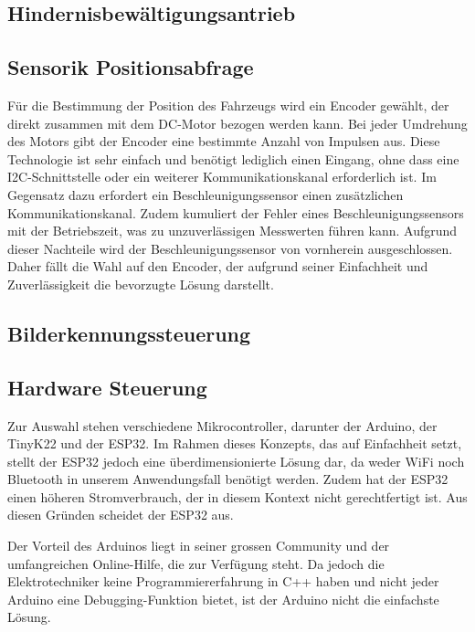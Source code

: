 \documentclass[../main.tex]{subfiles}
\begin{document}
\subsection{Hindernisbewältigungsantrieb}



\subsection{Sensorik Positionsabfrage}
Für die Bestimmung der Position des Fahrzeugs wird ein Encoder gewählt, der direkt zusammen mit dem DC-Motor bezogen werden kann. Bei jeder Umdrehung des Motors gibt der Encoder eine bestimmte Anzahl von Impulsen aus. Diese Technologie ist sehr einfach und benötigt lediglich einen Eingang, ohne dass eine I2C-Schnittstelle oder ein weiterer Kommunikationskanal erforderlich ist. Im Gegensatz dazu erfordert ein Beschleunigungssensor einen zusätzlichen Kommunikationskanal. Zudem kumuliert der Fehler eines Beschleunigungssensors mit der Betriebszeit, was zu unzuverlässigen Messwerten führen kann. Aufgrund dieser Nachteile wird der Beschleunigungssensor von vornherein ausgeschlossen. Daher fällt die Wahl auf den Encoder, der aufgrund seiner Einfachheit und Zuverlässigkeit die bevorzugte Lösung darstellt.


\subsection{Bilderkennungssteuerung}



\subsection{Hardware Steuerung}
Zur Auswahl stehen verschiedene Mikrocontroller, darunter der Arduino, der TinyK22 und der ESP32. Im Rahmen dieses Konzepts, das auf Einfachheit setzt, stellt der ESP32 jedoch eine überdimensionierte Lösung dar, da weder WiFi noch Bluetooth in unserem Anwendungsfall benötigt werden. Zudem hat der ESP32 einen höheren Stromverbrauch, der in diesem Kontext nicht gerechtfertigt ist. Aus diesen Gründen scheidet der ESP32 aus.

Der Vorteil des Arduinos liegt in seiner grossen Community und der umfangreichen Online-Hilfe, die zur Verfügung steht. Da jedoch die Elektrotechniker keine Programmiererfahrung in C++ haben und nicht jeder Arduino eine Debugging-Funktion bietet, ist der Arduino nicht die einfachste Lösung.
\end{document}
